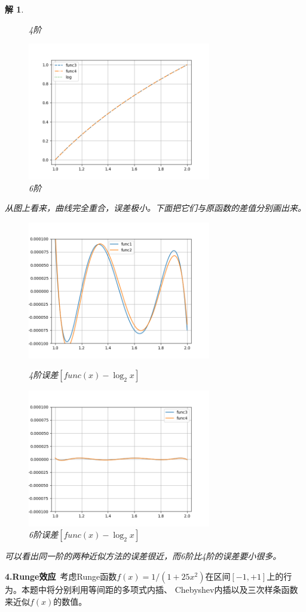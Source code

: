 \documentclass[10pt]{ctexart}
\newtheorem*{solution}{解}
\begin{document}
\begin{solution}
\begin{figure}[H]
\begin{minipage}{0.45\linewidth}
            \caption{4阶}
        \end{minipage}
        \qquad
        \begin{minipage}{0.45\linewidth}
            \centering
            \includegraphics[width=8cm]{6.png}
            \caption{6阶}
        \end{minipage}
    \end{figure}
    从图上看来，曲线完全重合，误差极小。下面把它们与原函数的差值分别画出来。
    \begin{figure}[H]
        \centering
        \begin{minipage}{0.45\linewidth}
            \centering
            \includegraphics[width=8cm]{err4.png}
            \caption{4阶误差$\left [func(x)-\log_{2}{x}\right ]$}
        \end{minipage}
        \qquad
        \begin{minipage}{0.45\linewidth}
            \centering
            \includegraphics[width=8cm]{err6.png}
            \caption{6阶误差$\left [func(x)-\log_{2}{x}\right ]$}
        \end{minipage}
    \end{figure}
    可以看出同一阶的两种近似方法的误差很近，而6阶比4阶的误差要小很多。
\end{solution}
\textbf{4.Runge效应}\ 考虑Runge函数$f(x)=1/(1+25x^2)$在区间$[-1,+1]$上的行为。本题中将分别利用等间距的多项式内插、
Chebyshev内插以及三次样条函数来近似$f(x)$的数值。
\end{document}
